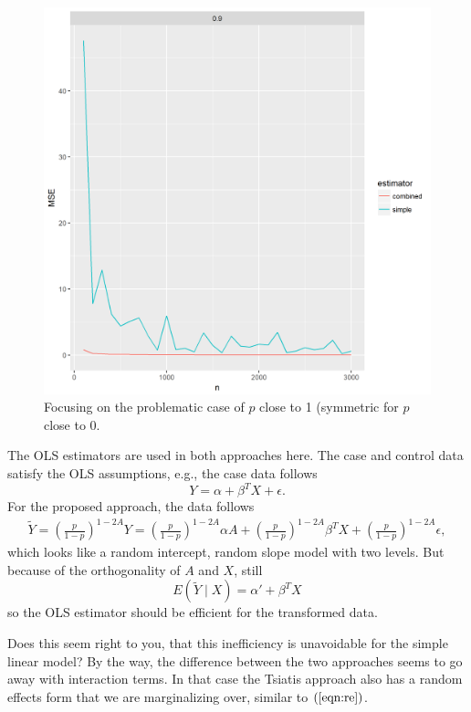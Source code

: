 \documentclass[10pt,a4paper]{amsart}
\newcommand{\EE}{E}
\begin{document}
\begin{figure}[h!]
  \includegraphics[width=\linewidth]{041118b.png}
  \caption{Focusing on the problematic case of $p$ close to 1
    (symmetric for $p$ close to 0.}  \label{fig:2}
\end{figure}

The OLS estimators are used in both approaches here. The case and
control data satisfy the OLS assumptions, e.g., the case data
follows
\[
  Y = \alpha + \beta^TX + \epsilon.
\]
For the proposed approach, the data follows
\begin{align}
  \tilde{Y} = \left(\frac{p}{1-p}\right)^{1-2A}Y = \left(\frac{p}{1-p}\right)^{1-2A}\alpha A +
  \left(\frac{p}{1-p}\right)^{1-2A} \beta^TX + \left(\frac{p}{1-p}\right)^{1-2A}\epsilon,
\label{eqn:re}
\end{align}
which looks like a random intercept, random slope model with two levels. But
because of the orthogonality of $A$ and $X$, still
\[
  \EE(\tilde{Y}\mid X) = \alpha' + \beta^T X
\]
so the OLS estimator should be efficient for the transformed
data.

Does this seem right to you, that this inefficiency is
unavoidable for the simple linear model? By the way, the difference between the
two approaches seems to go away with interaction terms. In that case
the Tsiatis approach also has a random effects form that we are
marginalizing over, similar to $(\ref{eqn:re})$.
\end{document}
